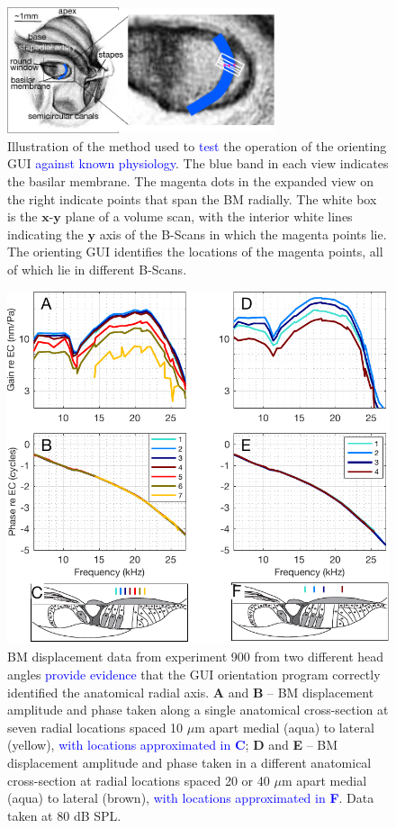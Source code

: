 \documentclass[preprint,NumberedRefs]{JASA}
\begin{document}
\begin{figure}[h!]
    \centering
    \includegraphics[width=0.7\textwidth]{Figure7.pdf}
    \caption{Illustration of the method used to \textcolor{blue}{test} the operation of the orienting GUI \textcolor{blue}{against known physiology}. The blue band in each view indicates the basilar membrane. The magenta dots in the expanded view on the right indicate points that span the BM radially. The white box is the $\mathbf{x}$-$\mathbf{y}$ plane of a volume scan, with the interior white lines indicating the $\mathbf{y}$ axis of the B-Scans in which the magenta points lie. The orienting GUI identifies the locations of the magenta points, all of which lie in different B-Scans.}
    \label{radial}
\end{figure}

\begin{figure}[h!]
    \centering
   \includegraphics[width=\textwidth]{Figure8.pdf}
    \caption{BM displacement data from experiment 900 from two different head angles \textcolor{blue}{provide evidence} that the GUI orientation program correctly identified the anatomical radial axis. \textbf{A} and \textbf{B} -- BM displacement amplitude and phase taken along a single anatomical cross-section at seven radial locations spaced 10 $\mu$m apart medial (aqua) to lateral (yellow), \textcolor{blue}{with locations approximated in \textbf{C}}; \textbf{D} and \textbf{E} -- BM displacement amplitude and phase taken in a different anatomical cross-section at radial locations spaced 20 or 40 $\mu$m apart medial (aqua) to lateral (brown), \textcolor{blue}{with locations approximated in \textbf{F}}. Data taken at 80 dB SPL.}
    \label{raddata}
\end{figure}
\end{document}
